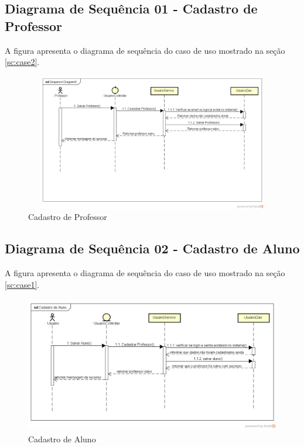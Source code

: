 \subsection{Diagrama de Sequência 01 - Cadastro de Professor}
A figura  apresenta o diagrama de sequência do caso de uso mostrado na seção \ref{sc:case2}.
\begin{figure}[h]
\begin{center}
  \includegraphics[width=15cm, height=6cm]{images/proposta-img/Figura4-3.png}
  \caption{Cadastro de Professor}
  \label{fig:Figura4-3}
\end{center}
\end{figure}
\subsection{Diagrama de Sequência 02 - Cadastro de Aluno}
A figura  apresenta o diagrama de sequência do caso de uso mostrado na seção \ref{sc:case1}.
\begin{figure}[htp]
\begin{center}
  \includegraphics[width=15cm, height=6cm]{images/proposta-img/Figura4-4.png}
  \caption{Cadastro de Aluno}
  \label{fig:Figura4-4}
\end{center}
\end{figure}
